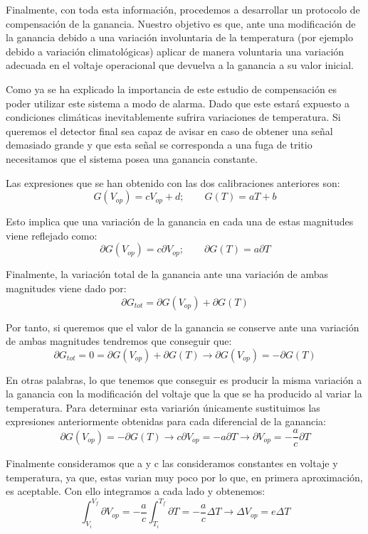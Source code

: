 Finalmente, con toda esta información, procedemos a desarrollar un protocolo de compensación de la ganancia. Nuestro objetivo es que, ante una modificación de la ganancia debido a una variación involuntaria de la temperatura (por ejemplo debido a variación climatológicas) aplicar de manera voluntaria una variación adecuada en el voltaje operacional que devuelva a la ganancia a su valor inicial.

Como ya se ha explicado la importancia de este estudio de compensación es poder utilizar este sistema a modo de alarma. Dado que este estará expuesto a condiciones climáticas inevitablemente sufrira variaciones de temperatura. Si queremos el detector final sea capaz de avisar en caso de obtener una señal demasiado grande y que esta señal se corresponda a una fuga de tritio necesitamos que el sistema posea una ganancia constante.

Las expresiones que se han obtenido con las dos calibraciones anteriores son:
$$G(V_{op})=cV_{op}+d; \qquad G(T)=aT+b$$

Esto implica que una variación de la ganancia en cada una de estas magnitudes viene reflejado como:
$$\partial G(V_{op}) = c \partial V_{op}; \qquad \partial G(T) = a \partial T$$

Finalmente, la variación total de la ganancia ante una variación de ambas magnitudes viene dado por:
$$\partial G_{tot} = \partial G(V_{op}) + \partial G(T)$$

Por tanto, si queremos que el valor de la ganancia se conserve ante una variación de ambas magnitudes tendremos que conseguir que: 
$$\partial G_{tot} = 0 =  \partial G(V_{op}) + \partial G(T) \longrightarrow \partial G(V_{op}) = -\partial G(T)  $$

En otras palabras, lo que tenemos que conseguir es producir la misma variación a la ganancia con la modificación del voltaje que la que se ha producido al variar la temperatura. Para determinar esta variarión únicamente sustituimos las expresiones anteriormente obtenidas para cada diferencial de la ganancia:
$$\partial G(V_{op}) = - \partial G(T)  \longrightarrow c \partial V_{op}= - a \partial T \longrightarrow  \partial V_{op}= - \frac{a}{c} \partial T$$

Finalmente consideramos que a y c las consideramos constantes en voltaje y temperatura, ya que, estas varian muy poco por lo que, en primera aproximación, es aceptable. Con ello integramos a cada lado y obtenemos:
$$\int_{V_i}^{V_f} \partial V_{op}= - \frac{a}{c} \int_{T_i}^{T_f}\partial T = - \frac{a}{c} \Delta T \longrightarrow \Delta V_{op}= e \Delta T$$

